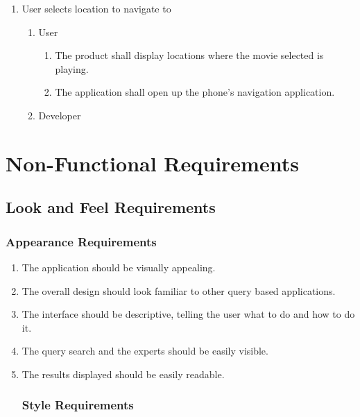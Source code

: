\documentclass[]{article}
\begin{document}
\begin{enumerate}[{BE}1.]
	\item User selects location to navigate to
	\begin{enumerate}[{VP3}.1]
		\item User
			\begin{enumerate}
				\item The product shall display locations where the movie selected is playing.
				\item The application shall open up the phone’s navigation application.
			\end{enumerate}
		\item Developer
	\end{enumerate}
\end{enumerate}



\section{Non-Functional Requirements}
\label{sec:non-functional_requirements}
\subsection{Look and Feel Requirements}
\label{sub:look_and_feel_requirements}

\subsubsection{Appearance Requirements}
\label{ssub:appearance_requirements}
\begin{enumerate}[{LF}1. ]
	\item The application should be visually appealing.
	\item The overall design should look familiar to other query based applications.
	\item The interface should be descriptive, telling the user what to do and how to do it.
	\item The query search and the experts should be easily visible.
	\item The results displayed should be easily readable.

\subsubsection{Style Requirements}
\label{ssub:style_requirements}
\end{enumerate}
\end{document}
